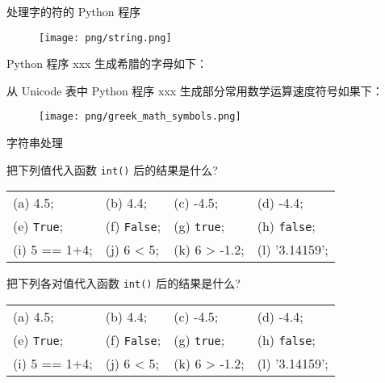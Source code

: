 \documentclass[main.tex]{subfiles}
\begin{document}
处理字的符的 Python 程序

\begin{figure}
	\texttt{[image: png/string.png]}
\end{figure}

Python 程序 xxx 生成希腊的字母如下：


从 Unicode 表中 Python 程序 xxx 生成部分常用数学运算速度符号如果下：


\begin{figure}
	\texttt{[image: png/greek\_math\_symbols.png]}
\end{figure}


字符串处理

\begin{Exercises}
	\item 把下列值代入函数 \verb|int()| 后的结果是什么?

	\begin{tabular}{l l l l} 
	(a) 4.5; & (b) 4.4;  & (c) -4.5; & (d) -4.4; \\
	(e) \verb|True|;  & (f) \verb|False|; & (g) \verb|true|;  & (h) \verb|false|; \\
	(i) 5 == 1+4;  & (j) 6 < 5; & (k) 6 > -1.2; & (l) \textsf{'}3.14159\textsf{'}; \\
	\end{tabular}
	\item 把下列各对值代入函数 \verb|int()| 后的结果是什么?

\begin{tabular}{l l l l} 
	(a) 4.5; & (b) 4.4;  & (c) -4.5; & (d) -4.4; \\
	(e) \verb|True|;  & (f) \verb|False|; & (g) \verb|true|;  & (h) \verb|false|; \\
	(i) 5 == 1+4;  & (j) 6 < 5; & (k) 6 > -1.2; & (l) \textsf{'}3.14159\textsf{'}; \\
\end{tabular}

\end{Exercises}
\end{document}
